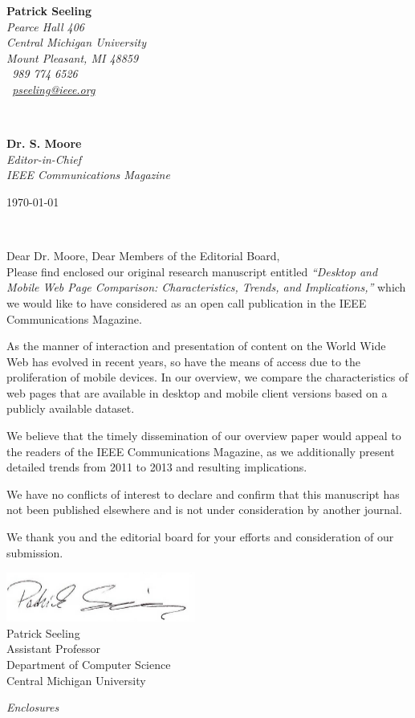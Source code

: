 \documentclass[11pt]{article}
\begin{document}
\hfill%
\begin{minipage}[t]{.6\textwidth}
\raggedleft%
{\bfseries Patrick Seeling}\\[.35ex]
\small\itshape%
Pearce Hall 406\\
Central Michigan University\\
Mount Pleasant, MI 48859\\[.35ex]
\Telefon~989 774 6526\\
\Letter~\href{mailto:pseeling@ieee.org}{pseeling@ieee.org}
\end{minipage}\\[1em]
%
\begin{minipage}[t]{.4\textwidth}
\raggedright%
{\bfseries Dr. S. Moore}\\[.35ex]
\small\itshape%
Editor-in-Chief\\
IEEE Communications Magazine
\end{minipage}
\hfill %
\begin{minipage}[t]{.4\textwidth}
\raggedleft %
\today
\end{minipage}\\[3em]
\raggedright
Dear Dr. Moore, Dear Members of the Editorial Board,\\[2em]

Please find enclosed our original research manuscript entitled
\textit{``Desktop and Mobile Web Page Comparison: Characteristics, Trends, and Implications,''} which we would like to have considered as an open call publication in the IEEE Communications Magazine. 

As the manner of interaction and presentation of content on the World Wide Web has evolved in recent years, so have the means of access due to the proliferation of mobile devices. 
In our overview, we compare the characteristics of web pages that are available in desktop and mobile client versions based on a publicly available dataset.


We believe that the timely dissemination of our overview paper would appeal to the readers of the IEEE Communications Magazine, as we additionally present detailed trends from 2011 to 2013 and resulting implications.


We have no conflicts of interest to declare and confirm that this manuscript has not been published elsewhere and is not under consideration by another journal.


We thank you and the editorial board for your efforts and consideration of our submission.

\vspace{2em}
\includegraphics[scale=0.75]{signature}\\
{
Patrick Seeling\\
Assistant Professor\\
Department of Computer Science\\
Central Michigan University}
  
\vspace{2em}
{\slshape Enclosures}
\end{document}
